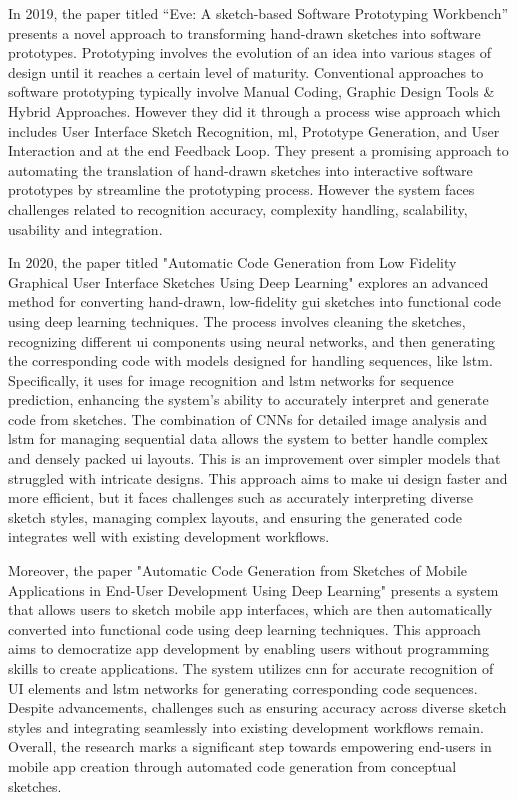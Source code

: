 \documentclass{ioereport}
\begin{document}
In 2019, the paper titled “Eve: A sketch-based Software Prototyping Workbench”
presents a novel approach to transforming hand-drawn sketches into software
prototypes. Prototyping involves the evolution of an idea into various stages of design
until it reaches a certain level of maturity. Conventional approaches to software
prototyping typically involve Manual Coding, Graphic Design Tools \& Hybrid
Approaches. However they did it through a process wise approach which includes User
Interface Sketch Recognition, \gls{ml}, Prototype Generation, and User
Interaction and at the end Feedback Loop. They present a promising approach to
automating the translation of hand-drawn sketches into interactive software prototypes by streamline the prototyping process. However the system faces challenges related to
recognition accuracy, complexity handling, scalability, usability and integration. \cite{10.1145/3290607.3312994}

In 2020, the paper titled "Automatic Code Generation from Low Fidelity Graphical
User Interface Sketches Using Deep Learning" explores an advanced method for
converting hand-drawn, low-fidelity \gls{gui} sketches into functional code using deep
learning techniques. The process involves cleaning the sketches, recognizing different
\gls{ui} components using neural networks, and then generating the corresponding code with
models designed for handling sequences, like \gls{lstm}. Specifically, it uses
 for image recognition and \gls{lstm} networks for sequence prediction, enhancing the system's ability to
accurately interpret and generate code from sketches. The combination of CNNs for
detailed image analysis and \gls{lstm} for managing sequential data allows the system to
better handle complex and densely packed \gls{ui} layouts. This is an improvement over
simpler models that struggled with intricate designs. This approach aims to make \gls{ui}
design faster and more efficient, but it faces challenges such as accurately interpreting
diverse sketch styles, managing complex layouts, and ensuring the generated code
integrates well with existing development workflows. \cite{9971204}

Moreover, the paper "Automatic Code Generation from Sketches of Mobile
Applications in End-User Development Using Deep Learning" presents a system that
allows users to sketch mobile app interfaces, which are then automatically converted
into functional code using deep learning techniques. This approach aims to democratize
app development by enabling users without programming skills to create applications.
The system utilizes \gls{cnn} for accurate recognition
of UI elements and \gls{lstm} networks for generating
corresponding code sequences. Despite advancements, challenges such as ensuring
accuracy across diverse sketch styles and integrating seamlessly into existing
development workflows remain. Overall, the research marks a significant step towards
empowering end-users in mobile app creation through automated code generation from
conceptual sketches. \cite{Baule2021}
\end{document}
